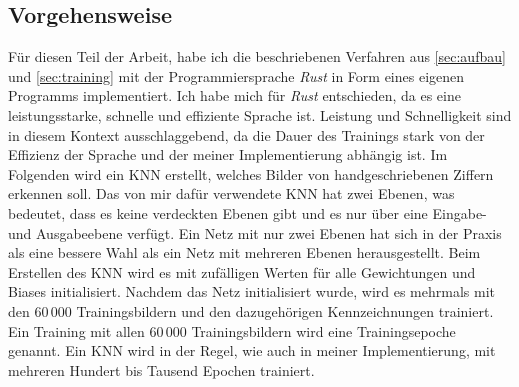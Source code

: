 \subsection{Vorgehensweise}\label{subsec:vorgehensweise}
Für diesen Teil der Arbeit, habe ich die beschriebenen Verfahren aus \autoref{sec:aufbau} und \autoref{sec:training} mit der Programmiersprache \textit{Rust} in Form eines eigenen Programms implementiert.
Ich habe mich für \textit{Rust} entschieden, da es eine leistungsstarke, schnelle und effiziente Sprache ist.
Leistung und Schnelligkeit sind in diesem Kontext ausschlaggebend, da die Dauer des Trainings stark von der Effizienz der Sprache und der meiner Implementierung abhängig ist.
Im Folgenden wird ein KNN erstellt, welches Bilder von handgeschriebenen Ziffern erkennen soll.
Das von mir dafür verwendete KNN hat zwei Ebenen, was bedeutet, dass es keine verdeckten Ebenen gibt und es nur über eine Eingabe- und Ausgabeebene verfügt.
Ein Netz mit nur zwei Ebenen hat sich in der Praxis als eine bessere Wahl als ein Netz mit mehreren Ebenen herausgestellt.
Beim Erstellen des KNN wird es mit zufälligen Werten für alle Gewichtungen und Biases initialisiert.
Nachdem das Netz initialisiert wurde, wird es mehrmals mit den 60\,000 Trainingsbildern und den dazugehörigen Kennzeichnungen trainiert.
Ein Training mit allen 60\,000 Trainingsbildern wird eine Trainingsepoche genannt.
Ein KNN wird in der Regel, wie auch in meiner Implementierung, mit mehreren Hundert bis Tausend Epochen trainiert.

